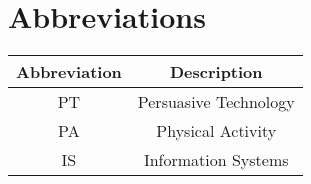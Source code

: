 \chapter*{Abbreviations}

\begin{table}[h]
\begin{tabular}{|c|c|}
\hline
\textbf{Abbreviation} & \textbf{Description} \\ \hline
PT & Persuasive Technology \\ \hline
PA & Physical Activity \\ \hline
IS & Information Systems \\ \hline
\end{tabular}
\end{table}
